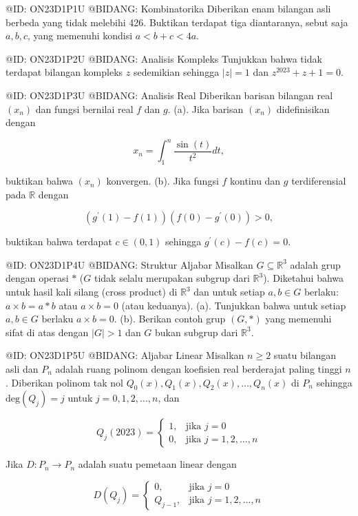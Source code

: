 @ID: ON23D1P1U
@BIDANG: Kombinatorika
Diberikan enam bilangan asli berbeda yang tidak melebihi 426. Buktikan terdapat tiga diantaranya, sebut saja $a, b, c$, yang memenuhi kondisi $a<b+c<4a$.

@ID: ON23D1P2U
@BIDANG: Analisis Kompleks
Tunjukkan bahwa tidak terdapat bilangan kompleks $z$ sedemikian sehingga $|z|=1$ dan $z^{2023}+z+1=0$.

@ID: ON23D1P3U
@BIDANG: Analisis Real
Diberikan barisan bilangan real $(x_{n})$ dan fungsi bernilai real $f$ dan $g$.
(a). Jika barisan $(x_{n})$ didefinisikan dengan

$$
x_{n}=\int_{1}^{n}\frac{\sin(t)}{t^{2}}dt,
$$

buktikan bahwa $(x_{n})$ konvergen.
(b). Jika fungsi $f$ kontinu dan $g$ terdiferensial pada $\mathbb{R}$ dengan

$$
(g^{\prime}(1)-f(1))(f(0)-g^{\prime}(0))>0,
$$

buktikan bahwa terdapat $c\in(0,1)$ sehingga $g^{\prime}(c)-f(c)=0$.

@ID: ON23D1P4U
@BIDANG: Struktur Aljabar
Misalkan $G\subseteq\mathbb{R}^{3}$ adalah grup dengan operasi $*$ ($G$ tidak selalu merupakan subgrup dari $\mathbb{R}^{3}$). Diketahui bahwa untuk hasil kali silang (cross product) di $\mathbb{R}^{3}$ dan untuk setiap $a, b\in G$ berlaku: $a\times b=a*b$ atau $a\times b=0$ (atau keduanya).
(a). Tunjukkan bahwa untuk setiap $a, b\in G$ berlaku $a\times b=0$.
(b). Berikan contoh grup $(G, *)$ yang memenuhi sifat di atas dengan $|G|>1$ dan $G$ bukan subgrup dari $\mathbb{R}^{3}$.

@ID: ON23D1P5U
@BIDANG: Aljabar Linear
Misalkan $n\ge2$ suatu bilangan asli dan $P_{n}$ adalah ruang polinom dengan koefisien real berderajat paling tinggi $n$. Diberikan polinom tak nol $Q_{0}(x), Q_{1}(x), Q_{2}(x), \dots, Q_{n}(x)$ di $P_{n}$ sehingga $\text{deg}(Q_{j})=j$ untuk $j=0,1,2,\dots,n$, dan

$$
Q_{j}(2023)=\begin{cases}1,&\text{jika } j=0\\ 0,&\text{jika } j=1,2,\dots,n\end{cases}
$$

Jika $D:P_{n}\rightarrow P_{n}$ adalah suatu pemetaan linear dengan

$$
D(Q_{j})=\begin{cases}0,&\text{jika } j=0\\ Q_{j-1},&\text{jika } j=1,2,\dots,n\end{cases}
$$

